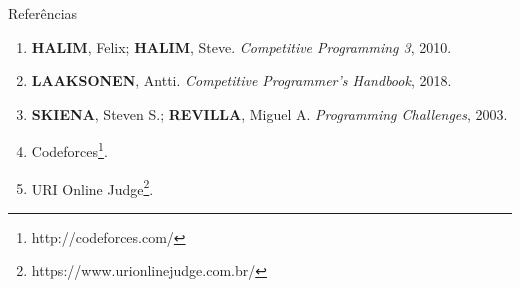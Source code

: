 \begin{frame}[fragile]{Referências}

    \begin{enumerate}
        \item \textbf{HALIM}, Felix; \textbf{HALIM}, Steve. \textit{Competitive Programming 3}, 2010.
        \item \textbf{LAAKSONEN}, Antti. \textit{Competitive Programmer's Handbook}, 2018.

        \item \textbf{SKIENA}, Steven S.; \textbf{REVILLA}, Miguel A. \textit{Programming
            Challenges}, 2003.

        \item Codeforces\footnote{http://codeforces.com/}.

        \item URI Online Judge\footnote{https://www.urionlinejudge.com.br/}.
    \end{enumerate}

\end{frame}
